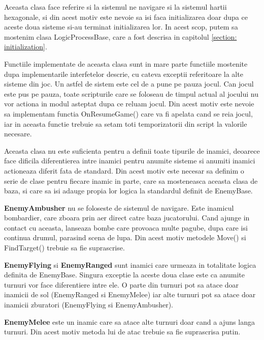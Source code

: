 \documentclass[12pt, a4paper]{article}
\begin{document}
	Aceasta clasa face referire si la sistemul ne navigare si la sistemul hartii hexagonale, si din acest motiv este nevoie sa isi faca initializarea doar dupa ce aceste doua sisteme si-au terminat initializarea lor. In acest scop, putem sa mostenim clasa LogicProcessBase, care a fost descrisa in capitolul \ref{section: initialization}.
	\newline
	
	Functiile implementate de aceasta clasa sunt in mare parte functiile mostenite dupa implementarile interfetelor descrie, cu cateva exceptii referitoare la alte sisteme din joc. Un astfel de sistem este cel de a pune pe pauza jocul. Can jocul este pus pe pauza, toate scripturile care se foloseau de timpul actual al jocului nu vor actiona in modul asteptat dupa ce reluam jocul. Din acest motiv este nevoie sa implementam functia OnResumeGame() care va fi apelata cand se reia jocul, iar in aceasta functie trebuie sa setam toti temporizatorii din script la valorile necesare.
	\newline
	
	Aceasta clasa nu este suficienta pentru a definii toate tipurile de inamici, deoarece face dificila diferentierea intre inamici pentru anumite sisteme si anumiti inamici actioneaza diferit fata de standard. Din acest motiv este necesar sa definim o serie de clase pentru fiecare inamic in parte, care sa mosteneasca aceasta clasa de baza, si care sa isi adauge propia lor logica la standardul definit de EnemyBase.
	\newline
	
	\textbf{EnemyAmbusher} nu se foloseste de sistemul de navigare. Este inamicul bombardier, care zboara prin aer direct catre baza jucatorului. Cand ajunge in contact cu aceasta, lanseaza bombe care provoaca multe pagube, dupa care isi continua drumul, parasind scena de lupa. Din acest motiv metodele Move() si FindTarget() trebuie sa fie suprascrise.
	\newline
	
	\textbf{EnemyFlying} si \textbf{EnemyRanged} sunt inamici care urmeaza in totalitate logica definita de EnemyBase. Singura exceptie la aceste doua clase este ca anumite turnuri vor face diferentiere intre ele. O parte din turnuri pot sa atace doar inamicii de sol (EnemyRanged si EnemyMelee) iar alte turnuri pot sa atace doar inamicii zburatori (EnemyFlying si EnemyAmbusher).
	\newline
	
	\textbf{EnemyMelee} este un inamic care sa atace alte turnuri doar cand a ajuns langa turnuri. Din acest motiv metoda lui de atac trebuie sa fie suprascrisa putin.
	
\end{document}

